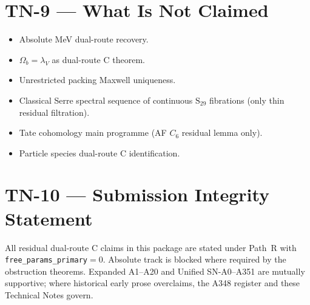 \documentclass[11pt,a4paper]{article}
\begin{document}
\section{TN-9 --- What Is Not Claimed}
\begin{itemize}
\item Absolute MeV dual-route recovery.
\item $\Omega_b=\lambda_V$ as dual-route C theorem.
\item Unrestricted packing Maxwell uniqueness.
\item Classical Serre spectral sequence of continuous $\mathrm{S}_{29}$ fibrations (only thin residual filtration).
\item Tate cohomology main programme (AF $C_6$ residual lemma only).
\item Particle species dual-route C identification.
\end{itemize}

\section{TN-10 --- Submission Integrity Statement}
All residual dual-route C claims in this package are stated under Path~R with
\texttt{free\_params\_primary}${=}0$. Absolute track is blocked where required by the obstruction theorems.
Expanded A1--A20 and Unified SN-A0--A351 are mutually supportive; where historical early prose
overclaims, the A348 register and these Technical Notes govern.
\end{document}
